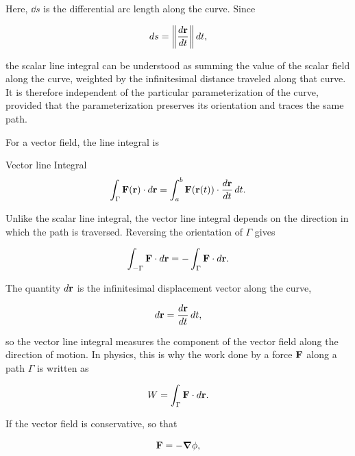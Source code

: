 			Here, $\dd{s}$ is the differential arc length along the curve. Since

			\begin{equation}
				\dd{s}
				=
				\norm{\dv{\vb r}{t}}\,dt,
			\end{equation}

			the scalar line integral can be understood as summing the value of the scalar field along the curve, weighted by the infinitesimal distance traveled along that curve. It is therefore independent of the particular parameterization of the curve, provided that the parameterization preserves its orientation and traces the same path.

			For a vector field, the line integral is

			\begin{definition}{Vector line Integral}
				\begin{equation}
					\int_\Gamma \vb F(\vb r)\cdot d\vb r
					=
					\int_{a}^{b}
					\vb F(\vb r(t))
					\cdot
					\dv{\vb r}{t}\,dt.
				\end{equation}
			\end{definition}

			Unlike the scalar line integral, the vector line integral depends on the direction in which the path is traversed. Reversing the orientation of $\Gamma$ gives

			\begin{equation}
				\int_{-\Gamma}\vb F\cdot d\vb r
				=
				-\int_{\Gamma}\vb F\cdot d\vb r.
			\end{equation}

			The quantity $d\vb r$ is the infinitesimal displacement vector along the curve,

			\begin{equation}
				d\vb r
				=
				\dv{\vb r}{t}\,dt,
			\end{equation}

			so the vector line integral measures the component of the vector field along the direction of motion. In physics, this is why the work done by a force $\vb F$ along a path $\Gamma$ is written as

			\begin{equation}
				W
				=
				\int_\Gamma \vb F\cdot d\vb r.
			\end{equation}

			If the vector field is conservative, so that

			\begin{equation}
				\vb F = -\grad \phi,
			\end{equation}

